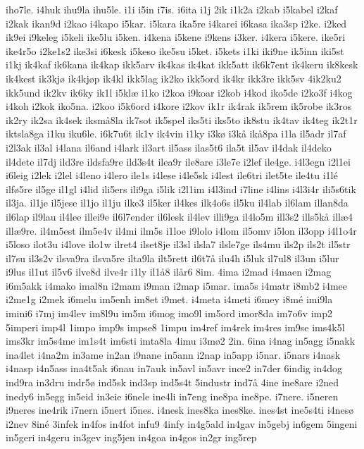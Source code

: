{iho7le.
i4huk
ihu9la
ihu5le.
i1i
i5in
i7is.
i6ita
i1j
2ik
i1k2a
i2kab
i5kabel
i2kaf
i2kak
ikan9d
i2kao
i4kapo
i5kar.
i5kara
ika5re
i4karei
i6kasa
ika3sp
i2ke.
i2ked
ik9ei
i9keleg
i5keli
ike5lu
i5ken.
i4kena
i5kene
i9kens
i3ker.
i4kera
i5kere.
ike5ri
ike4r5o
i2ke1s2
ike3si
i6kesk
i5keso
ike5su
i5ket.
i5kets
i1ki
iki9ne
ik5inn
iki5st
i1kj
ik4kaf
ik6kana
ik4kap
ikk5arv
ik4kas
ik4kat
ikk5att
ik6k7ent
ik4keru
ik8kesk
ik4kest
ik3kjø
ik4kjøp
ik4kl
ikk5lag
ik2ko
ikk5ord
ik4kr
ikk3re
ikk5sv
4ik2ku2
ikk5und
ik2kv
ik6ky
ik1l
i5klæ
i1ko
i2koa
i9koar
i2kob
i4kod
iko5de
i2ko3f
i4kog
i4koh
i2kok
iko5na.
i2koo
i5k6ord
i4kore
i2kov
ik1r
ik4rak
ik5rem
ik5robe
ik3ros
ik2ry
ik2sa
ik4sek
iksmå8la
ik7sot
ik5spel
iks5ti
iks5to
ik8stu
ik4tav
ik4teg
ik2t1r
iktsla8ga
i1ku
iku6le.
i6k7u6t
ik1v
ik4vin
i1ky
i3kø
i3kå
ikå8pa
i1la
il5adr
il7af
i2l3ak
il3al
i4lana
il6and
i4lark
il3art
il5ass
ilas5t6
ila5t
il5av
il4dak
il4deko
il4dete
il7dj
ild3re
ildsfa9re
ild3s4t
ilea9r
ile8are
i3le7e
i2lef
ile4ge.
i4l3egn
i2l1ei
i6leig
i2lek
i2lel
i4leno
i4lero
ile1s
i4lese
i4le5sk
i4lest
ile6tri
ilet5te
ile4tu
i1lé
ilfø5re
il5ge
il1gl
i4lid
ili5ers
ili9ga
i5lik
i2l1im
i4l3ind
i7line
i4lins
i4l3i4r
ili5s6tik
il3ja.
il1je
il5jese
il1jo
il1ju
ilke3
il5ker
il4kes
ilk4o6s
il5ku
il4lab
il6lam
illan8da
il6lap
il9lau
il4lee
illei9e
il6l7ender
il6lesk
il4lev
illi9ga
il4lo5m
ill3s2
ills5kå
illæ4
illæ9re.
il4m5est
ilm5e4v
il4mi
ilm5s
i1loe
i9lolo
i4lom
il5omv
i5lon
il3opp
i4l1o4r
i5loso
ilot3u
i4love
ilo1w
ilret4
ilset8je
il3sl
ilsla7
ilsle7ge
ils4mu
ils2p
ils2t
il5str
il7su
il3s2v
ilsva9ra
ilsva5re
ilta9la
ilt5rett
il6t7å
ilu4h
i5luk
il7ul8
il3un
i5lur
i9lus
il1ut
il5v6
ilve8d
ilve4r
i1ly
il1å8
ilår6
8im.
4ima
i2mad
i4maen
i2mag
i6m5akk
i4mako
imal8n
i2mam
i9man
i2map
i5mar.
ima5s
i4matr
i8mb2
i4mee
i2me1g
i2mek
i6melu
im5enh
im8et
i9met.
i4meta
i4meti
i6mey
i8mé
imi9la
imini6
i7mj
im4lev
im8l9u
im5m
i6mog
imo9l
im5ord
imor8da
im7o6v
imp2
5imperi
imp4l
1impo
imp9s
impse8
1impu
im4ref
im4rek
im4res
im9se
ims4k5l
ims3kr
im5s4me
im1s4t
im6sti
imta8la
4imu
i3mø2
2in.
6ina
i4nag
in5agg
i5nakk
ina4let
i4na2m
in3ame
in2an
i9nane
in5ann
i2nap
in5app
i5nar.
i5nars
i4nask
i4nasp
i4n5ass
ina4t5ak
i6nau
in7auk
in5avl
in5avr
ince2
in7der
6indig
in4dog
ind9ra
in3dru
indr5ø
ind5sk
ind3sp
ind5s4t
5industr
ind7å
4ine
ine8are
i2ned
inedy6
in5egg
in5eid
in3eie
i6nele
ine4li
in7eng
ine8pa
ine8pe.
i7nere.
i5neren
i9neres
ine4rik
i7nern
i5nert
i5nes.
i4nesk
ines8ka
ines8ke.
ines4st
ine5s4ti
i4nesø
i2nev
8iné
3infek
in4fos
in4fot
infu9
4infy
in4g5ald
in4gav
in5gebj
in6gem
5ingeni
in5geri
in4geru
in3gev
ing5jen
in4goa
in4gos
in2gr
ing5rep
}
